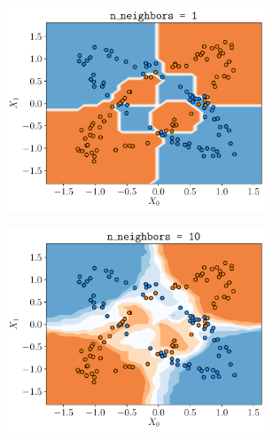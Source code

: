 \documentclass[a4paper, 12pt]{article}
\begin{document}
\begin{enumerate}[label = (\alph*)]
\begin{figure}[h]
\begin{subfigure}{0.49\textwidth}
            \end{subfigure}
            \label{fig:decision_boundary_neighbor_make_data1}
        \end{figure}
        \begin{figure}[h]
            \centering
            \begin{subfigure}{0.49\textwidth}
                \centering
        	    \includegraphics[width=0.85\textwidth]{resources/pdf/make_data2_neighbors1.pdf}
            \end{subfigure}
            \begin{subfigure}{0.49\textwidth}
                \centering
        	    \includegraphics[width=0.85\textwidth]{resources/pdf/make_data2_neighbors10.pdf}
            \end{subfigure}

\end{figure}
\end{enumerate}
\end{document}

